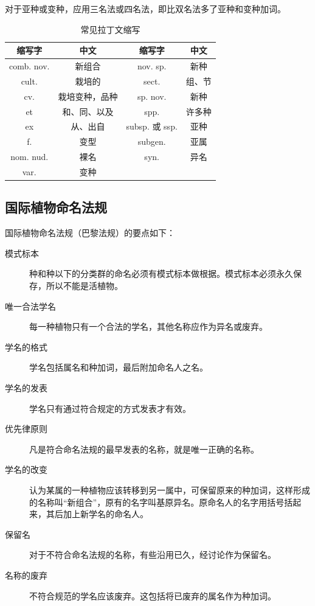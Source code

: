 对于亚种或变种，应用三名法或四名法，即比双名法多了亚种和变种加词。

\begin{table}[htbp]
	\centering
	\begin{tabularx}{\textwidth}{|C|C||C|C|}
		\hline
		\textbf{缩写字} & \textbf{中文} & \textbf{缩写字} & \textbf{中文} \\ \hline
		comb. nov. & 新组合 & nov. sp. & 新种 \\ \hline
		cult. & 栽培的 & sect. & 组、节 \\ \hline
		cv. & 栽培变种，品种 & sp. nov. & 新种 \\ \hline
		et & 和、同、以及 & spp. & 许多种 \\ \hline
		ex & 从、出自 & subsp. 或 ssp. & 亚种 \\ \hline
		f. & 变型 & subgen. & 亚属 \\ \hline
		nom. nud. & 裸名 & syn. & 异名 \\ \hline
		var. & 变种 &  &  \\ \hline
	\end{tabularx}
	\caption{常见拉丁文缩写}
	\label{tab:latin_abbrs}
\end{table}

\subsection{国际植物命名法规}

国际植物命名法规（巴黎法规）的要点如下：
\begin{description}
	\item[模式标本] 种和种以下的分类群的命名必须有模式标本做根据。模式标本必须永久保存，所以不能是活植物。
	\item[唯一合法学名] 每一种植物只有一个合法的学名，其他名称应作为异名或废弃。
	\item[学名的格式] 学名包括属名和种加词，最后附加命名人之名。
	\item[学名的发表] 学名只有通过符合规定的方式发表才有效。
	\item[优先律原则] 凡是符合命名法规的最早发表的名称，就是唯一正确的名称。
	\item[学名的改变] 认为某属的一种植物应该转移到另一属中，可保留原来的种加词，这样形成的名称叫“新组合”，原有的名字叫基原异名。原命名人的名字用括号括起来，其后加上新学名的命名人。
	\item[保留名] 对于不符合命名法规的名称，有些沿用已久，经讨论作为保留名。
	\item[名称的废弃] 不符合规范的学名应该废弃。这包括将已废弃的属名作为种加词。
\end{description}

